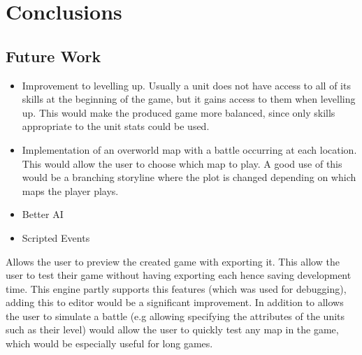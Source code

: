 \section{Conclusions}


\subsection{Future Work}
\begin{itemize}
\item Improvement to levelling up. 
	Usually a unit does not have access to all of its skills at the beginning of the game, but it gains access to them when levelling up.  This would make the produced game  more balanced, since only skills appropriate to the unit stats could be used.

\item Implementation of an overworld map with a battle occurring at each location. This would allow the user to choose which map to play.  A good use of this would be a branching storyline where the plot is changed depending on which maps the player plays.
 
\item  Better AI

\item Scripted Events


\end{itemize}

Allows the user to preview the created game with exporting it.  This allow the user to test their game without having exporting each hence saving development time.  This engine partly supports this features (which was used for debugging), adding this to editor would be a significant improvement. In addition to allows the user to simulate a battle (e.g allowing specifying the attributes of the units such as their level)  would allow the user to quickly test any map in the game, which would be especially useful for long games.
